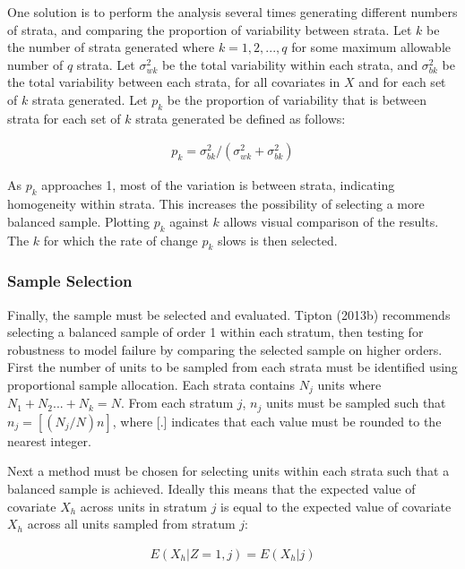 \documentclass[man,floatsintext]{apa6}
\theoremstyle{definition}
\theoremstyle{definition}
\theoremstyle{definition}
\theoremstyle{remark}
\begin{document}
One solution is to perform the analysis several times generating
different numbers of strata, and comparing the proportion of variability
between strata. Let \(k\) be the number of strata generated where
\(k = 1, 2, ..., q\) for some maximum allowable number of \(q\) strata.
Let \(\sigma_{wk}^2\) be the total variability within each strata, and
\(\sigma_{bk}^2\) be the total variability between each strata, for all
covariates in \(X\) and for each set of \(k\) strata generated. Let
\(p_k\) be the proportion of variability that is between strata for each
set of \(k\) strata generated be defined as follows:

\begin{align} \label{eq:pk}
  p_k = \sigma_{bk}^2/(\sigma_{wk}^2 + \sigma_{bk}^2)
\end{align}

As \(p_k\) approaches 1, most of the variation is between strata,
indicating homogeneity within strata. This increases the possibility of
selecting a more balanced sample. Plotting \(p_k\) against \(k\) allows
visual comparison of the results. The \(k\) for which the rate of change
\(p_k\) slows is then selected.

\hypertarget{sample-selection}{%
\subsubsection{Sample Selection}\label{sample-selection}}

Finally, the sample must be selected and evaluated. Tipton (2013b)
recommends selecting a balanced sample of order 1 within each stratum,
then testing for robustness to model failure by comparing the selected
sample on higher orders. First the number of units to be sampled from
each strata must be identified using proportional sample allocation.
Each strata contains \(N_j\) units where \(N_1 + N_2 ... + N_k = N\).
From each stratum \(j\), \(n_j\) units must be sampled such that
\(n_j = [(N_j/N)n]\), where {[}.{]} indicates that each value must be
rounded to the nearest integer.

Next a method must be chosen for selecting units within each strata such
that a balanced sample is achieved. Ideally this means that the expected
value of covariate \(X_h\) across units in stratum \(j\) is equal to the
expected value of covariate \(X_h\) across all units sampled from
stratum \(j\):

\begin{align}
  E(X_h|Z = 1, j) = E(X_h|j)
\end{align}
\end{document}
